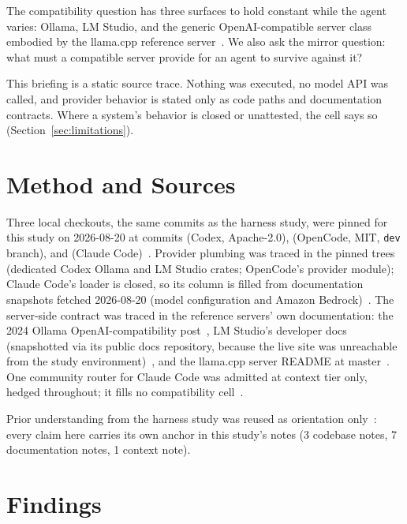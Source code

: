 \documentclass{article}
\newcommand{\codex}[0]{Codex}
\newcommand{\occ}[0]{OpenCode}
\newcommand{\ccc}[0]{Claude Code}
\begin{document}
The compatibility question has three surfaces to hold constant while the
agent varies: Ollama, LM Studio, and the generic OpenAI-compatible
server class embodied by the llama.cpp reference
server~\citep{ollamaCompatDocs,lmstudioApiDocs,llamaCppServerDocs}. We
also ask the mirror question: what must a compatible server provide for
an agent to survive against it?

This briefing is a static source trace. Nothing was executed, no model
API was called, and provider behavior is stated only as code paths and
documentation contracts. Where a system's behavior is closed or
unattested, the cell says so (Section~\ref{sec:limitations}).

\section{Method and Sources}
\label{sec:methods}

Three local checkouts, the same commits as the harness study, were
pinned for this study on 2026-08-20 at commits
 (\codex{}, Apache-2.0),
 (\occ{}, MIT,
\texttt{dev} branch), and
(\ccc{})~\citep{codexRepo,opencodeRepo,claudeCodeSurface}. Provider
plumbing was traced in the pinned trees (dedicated \codex{} Ollama and LM
Studio crates; \occ{}'s provider module); \ccc{}'s loader is closed, so
its column is filled from documentation snapshots fetched 2026-08-20
(model configuration and Amazon
Bedrock)~\citep{claudeCodeModelDocs,claudeCodeBedrockDocs}. The
server-side contract was traced in the reference servers' own
documentation: the 2024 Ollama OpenAI-compatibility
post~\citep{ollamaCompatDocs}, LM Studio's developer docs (snapshotted
via its public docs repository, because the live site was unreachable
from the study environment)~\citep{lmstudioApiDocs}, and the llama.cpp
server README at master~\citep{llamaCppServerDocs}. One community
router for \ccc{} was admitted at context tier only, hedged throughout;
it fills no compatibility cell~\citep{claudeCodeRouterContext}.

Prior understanding from the harness study was reused as orientation
only~\citep{codexRepo,opencodeRepo}: every claim here carries its own
anchor in this study's notes (3 codebase notes, 7 documentation notes,
1 context note).

\section{Findings}
\end{document}
